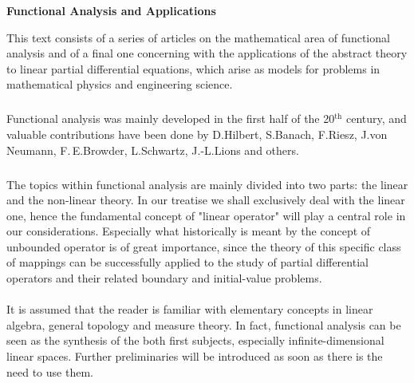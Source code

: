 \documentclass[11pt,twoside]{article}
\begin{document}
\thispagestyle{empty}

\def\Title{Functional Analysis and Applications}

\centerline{\large{\textbf{\Title}}}
\vspace{4pt}
\centerline{\small{\textsc{\Author}}}
\vspace{10pt}



\fancyhead[OL]{\small{\thepage}}
\fancyhead[ER]{\small{\thepage}}

This text consists of a series of articles
on the mathematical area of {functional analysis}
and of a final one concerning with the applications of the abstract theory
to linear partial differential equations,
which arise as models for problems
in mathematical physics and engineering science.

\subparagraph{}
Functional analysis was mainly developed
in the first half of the 20$^{\textrm{th}}$ century,
and valuable contributions have been done by
{D.\;Hilbert},
{S.\;Banach},
{F.\;Riesz},
{J.\;von Neumann},
{F.\,E.\;Browder},
{L.\;Schwartz},
{J.-L.\;Lions} and others.

\subparagraph{}
The topics within functional analysis are mainly divided into two parts:
the linear and the non-linear theory.
In our treatise we shall exclusively deal with the linear one,
hence the fundamental concept of {"linear operator"}
will play a central role in our considerations.
Especially
what historically is meant by the concept of unbounded operator
is of great importance,
since the theory of this specific class of mappings can be successfully applied
to the study of partial differential operators
and their related boundary and initial-value problems.

\paragraph{}
It is assumed that
the reader is familiar with elementary concepts in linear algebra,
general topology and measure theory.
In fact,
functional analysis can be seen as the synthesis of the both first subjects,
especially {\wrt} infinite-dimensional linear spaces.
Further preliminaries
will be introduced as soon as there is the need to use them.
\end{document}
